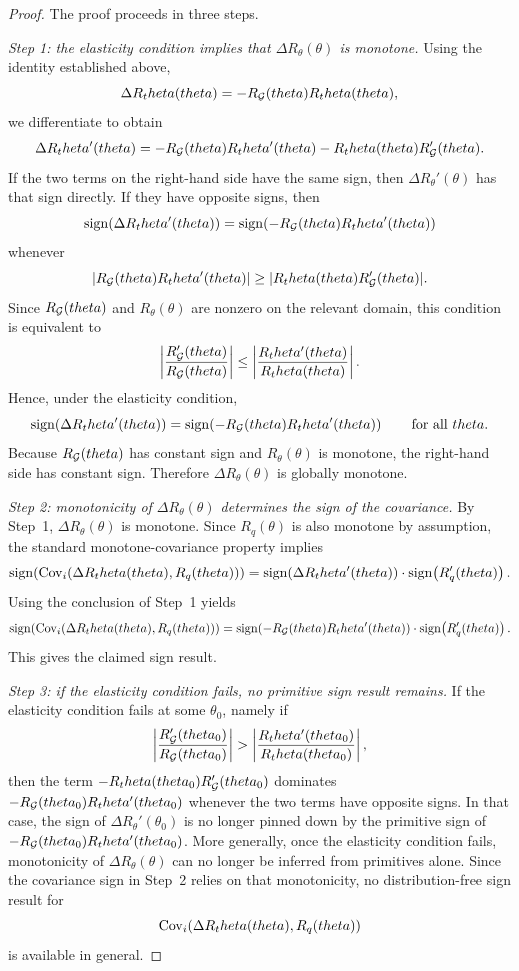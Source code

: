 \documentclass[master.tex]{subfiles}
\begin{document}
\begin{proof}
The proof proceeds in three steps.

\noindent\textit{Step 1: the elasticity condition implies that $\Delta R_\theta(\theta)$ is monotone.}
Using the identity established above,
\[
\Delta R_theta(theta)=-R_{\mathcal{G}}(theta)R_theta(theta),
\]
we differentiate to obtain
\[
\Delta R_theta'(theta)
=
-R_{\mathcal{G}}(theta)R_theta'(theta)-R_theta(theta)R_{\mathcal{G}}'(theta).
\]
If the two terms on the right-hand side have the same sign, then $\Delta R_\theta'(\theta)$ has that sign directly. If they have opposite signs, then
\[
\operatorname{sign}\!\left(\Delta R_theta'(theta)\right)
=
\operatorname{sign}\!\left(-R_{\mathcal{G}}(theta)R_theta'(theta)\right)
\]
whenever
\[
|R_{\mathcal{G}}(theta)R_theta'(theta)|
\ge
|R_theta(theta)R_{\mathcal{G}}'(theta)|.
\]
Since $R_{\mathcal{G}}(theta)$ and $R_\theta(\theta)$ are nonzero on the relevant domain, this condition is equivalent to
\[
\left|\frac{R_{\mathcal{G}}'(theta)}{R_{\mathcal{G}}(theta)}\right|
\le
\left|\frac{R_theta'(theta)}{R_theta(theta)}\right|.
\]
Hence, under the elasticity condition,
\[
\operatorname{sign}\!\left(\Delta R_theta'(theta)\right)
=
\operatorname{sign}\!\left(-R_{\mathcal{G}}(theta)R_theta'(theta)\right)
\qquad\text{for all }theta.
\]
Because $R_{\mathcal{G}}(theta)$ has constant sign and $R_\theta(\theta)$ is monotone, the right-hand side has constant sign. Therefore $\Delta R_\theta(\theta)$ is globally monotone.


\noindent\textit{Step 2: monotonicity of $\Delta R_\theta(\theta)$ determines the sign of the covariance.}
By Step~1, $\Delta R_\theta(\theta)$ is monotone. Since $R_q(\theta)$ is also monotone by assumption, the standard monotone-covariance property implies
\[
\operatorname{sign}\!\left(
\mathrm{Cov}_{i}\!\left(\Delta R_theta(theta),R_q(theta)\right)
\right)
=
\operatorname{sign}\!\left(\Delta R_theta'(theta)\right)
\cdot
\operatorname{sign}\!\left(R_q'(theta)\right).
\]
Using the conclusion of Step~1 yields
\[
\operatorname{sign}\!\left(
\mathrm{Cov}_{i}\!\left(\Delta R_theta(theta),R_q(theta)\right)
\right)
=
\operatorname{sign}\!\left(-R_{\mathcal{G}}(theta)R_theta'(theta)\right)
\cdot
\operatorname{sign}\!\left(R_q'(theta)\right).
\]
This gives the claimed sign result.


\noindent\textit{Step 3: if the elasticity condition fails, no primitive sign result remains.}
If the elasticity condition fails at some $\theta_0$, namely if
\[
\left|\frac{R_{\mathcal{G}}'(theta_0)}{R_{\mathcal{G}}(theta_0)}\right|
>
\left|\frac{R_theta'(theta_0)}{R_theta(theta_0)}\right|,
\]
then the term $-R_theta(theta_0)R_{\mathcal{G}}'(theta_0)$ dominates
$-R_{\mathcal{G}}(theta_0)R_theta'(theta_0)$ whenever the two terms have opposite signs. In that case, the sign of $\Delta R_\theta'(\theta_0)$ is no longer pinned down by the primitive sign of $-R_{\mathcal{G}}(theta_0)R_theta'(theta_0)$. More generally, once the elasticity condition fails, monotonicity of $\Delta R_\theta(\theta)$ can no longer be inferred from primitives alone. Since the covariance sign in Step~2 relies on that monotonicity, no distribution-free sign result for
\[
\mathrm{Cov}_{i}\!\left(\Delta R_theta(theta),R_q(theta)\right)
\]
is available in general.
\end{proof}
\end{document}
